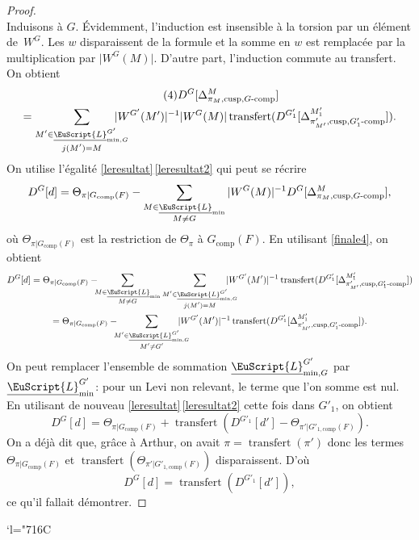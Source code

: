 \documentclass[JEP,XML,SOM,Unicode,francais]{cedram}
\let\mathcal \EuScript
\newcommand{\Changelback}{\mathcode`l="716C}
\newcommand{\NoChangel}[1]{%
\expandafter\let\csname old\string#1\endcsname=#1
\let#1=\relax
\newcommand{#1}{\mathcode`l="716C\csname old\string#1\endcsname\mathcode`l="7160 }%
}
\newcommand{\comp}{\mathrm{comp}}
\newcommand{\tcomp}{\textup{-comp}}
\newcommand{\cusp}{\mathrm{cusp}}
\newcommand{\trel}{\textup{-rel}} \NoChangel{\trel}
\DeclareMathOperator{\transfert}{transfert}
\newcommand{\cL}{\mathcal{L}}
\theoremstyle{plain}
\theoremstyle{definition}
\begin{document}
\begin{proof}
\[\]
Induisons à $G$. Évidemment, l'induction est insensible à la torsion par un élément de~$W^G$. Les $w$ disparaissent de la formule et la somme en $w$ est remplacée par la multiplication par $\vert W^G(M)\vert $. D'autre part, l'induction commute au transfert. On obtient
\begin{multline*}\tag{4}\label{finale4}
D^G[\Delta^M_{\pi_{M},\cusp,G\tcomp}]\\
= \sum_{\substack{M'\in \underline{\cL}_{\min,G\trel}^{G'}\\ j(M')=M}}\hspace*{-5mm}\vert W^{G'}(M')\vert ^{-1}\vert W^G(M)\vert \transfert(D^{G'_{1}}[\Delta^{M'_{1}}_{\pi'_{M'},\cusp,G'_{1}\tcomp}]).
\end{multline*}
On utilise l'égalité \ref{leresultat}\,\eqref{leresultat2} qui
peut se récrire
\[
D^G[d]= \Theta_{\pi\vert G_{\comp}(F)}-\sum_{\substack{M\in \underline{\cL}_{\min}\\M\neq G}}\vert W^G(M)\vert ^{-1}D^G[\Delta^M_{\pi_{M},\cusp,G\tcomp}],
\]
où $ \Theta_{\pi\vert G_{\comp}(F)}$ est la restriction de $\Theta_{\pi}$ à $G_{\comp}(F)$.
En utilisant \eqref{finale4}, on obtient
\begin{multline*}
D^G[d]
= \Theta_{\pi\vert G_{\comp}(F)}-\hspace*{-2mm}\sum_{\substack{M\in \underline{\cL}_{\min}\\M\neq G}}\sum_{\substack{M'\in \underline{\cL}_{\min,G\trel}^{G'}\\ j(M')=M}}\hspace*{-5mm}\vert W^{G'}(M')\vert ^{-1}
\transfert(D^{G'_{1}}[\Delta^{M'_{1}}_{\pi'_{M'},\cusp,G'_{1}\tcomp}])
\\
=\Theta_{\pi\vert G_{\comp}(F)}-\hspace*{-2mm}\sum_{\substack{M'\in \underline{\cL}_{\min,G\trel}^{G'}\\ M'\neq G'}}\hspace*{-5mm}\vert W^{G'}(M')\vert ^{-1} \transfert(D^{G'_{1}}[\Delta^{M'_{1}}_{\pi'_{M'},\cusp,G'_{1}\tcomp}]).
\end{multline*}
On peut remplacer l'ensemble de sommation $ \underline{\cL}_{\min,G\trel}^{G'}$ par $ \underline{\cL}_{\min}^{G'}$: pour un Levi non relevant, le terme que l'on somme est nul.
En utilisant de nouveau \ref{leresultat}\,\eqref{leresultat2} cette fois dans $G'_{1}$, on obtient
\[
D^G[d]= \Theta_{\pi\vert G_{\comp}(F)}+\transfert(D^{G'_{1}}[d']-\Theta_{\pi'\vert G'_{1,\comp}(F)}).
\]
On a déjà dit que, grâce à Arthur, on avait $\pi=\transfert(\pi')$ donc les termes $\Theta_{\pi\vert G_{\comp}(F)}$ et $\transfert(\Theta_{\pi'\vert G'_{1,\comp}(F)})$ disparaissent. D'où
\[
D^G[d]= \transfert(D^{G'_{1}}[d']),
\]
ce qu'il fallait démontrer.
\end{proof}

\Changelback
\backmatter
\nocite{P-R08}


\end{document}
